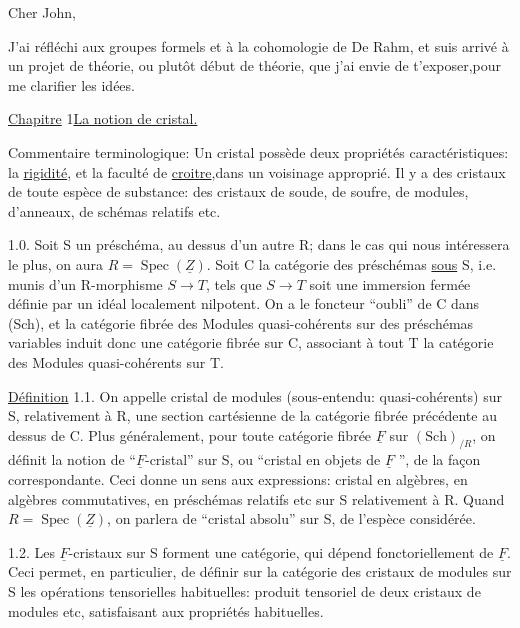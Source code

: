 
Cher John,

J'ai réfléchi aux groupes formels et à la cohomologie de De Rahm, et suis arrivé à un projet de théorie, ou plutôt  début de théorie, que j'ai envie de t'exposer,pour me clarifier les idées.

\uline{Chapitre} 1\qquad\uline{La notion de cristal.}

Commentaire terminologique: Un cristal possède deux propriétés caractéristiques: la \uline{rigidité}, et la faculté de \uline{croitre},dans un voisinage approprié. Il y a des cristaux de toute espèce de substance: des cristaux de soude, de soufre, de modules, d'anneaux, de schémas relatifs etc.

1.0. Soit S un préschéma, au dessus d'un autre R; dans le cas qui nous intéressera le plus, on aura $R=\operatorname{Spec}(\underline Z)$. Soit C la catégorie des préschémas  \uline{sous} S, \inserted{(}i.e. munis d'un R-morphisme $S\to T$,\inserted{)} tels que $S\to T$ soit une immersion fermée définie par un idéal localement nilpotent. On a le foncteur ``oubli'' de C dans (Sch), et la catégorie fibrée des Modules quasi-cohérents sur des préschémas variables induit donc une catégorie fibrée sur C, associant à tout T la catégorie des Modules quasi-cohérents sur T.

\uline{Définition} 1.1. On appelle cristal de modules (sous-entendu: quasi-cohérents) sur S, relativement à R, une section cartésienne de la catégorie fibrée précédente au dessus de C. Plus généralement, pour toute catégorie fibrée $\underline F$ sur $(\mathrm{Sch})_{/R}$, on définit la notion de ``$\underline F$-cristal'' sur S, ou ``cristal en objets de $\underline F$ '', de la façon correspondante. Ceci donne un sens aux expressions: cristal en algèbres, en algèbres commutatives, en préschémas relatifs etc\inserted{,} sur S relativement à R. Quand $R=\operatorname{Spec}(\underline Z)$, on parlera de ``cristal absolu'' sur S, de l'espèce considérée.

1.2. Les $\underline F$-cristaux sur S forment une catégorie, qui dépend fonctoriellement de $\underline F$. Ceci permet, en particulier, de définir sur la catégorie des cristaux de modules sur S les opérations tensorielles habituelles: produit tensoriel de deux cristaux de modules etc, satisfaisant aux propriétés habituelles.
